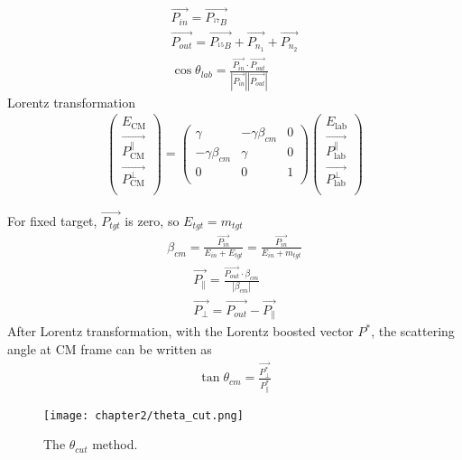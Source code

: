 \begin{align}
    \vec{P_{in}} = \vec{P_{{}^{17}B}} \\
    \vec{P_{out}} = \vec{P_{{}^{15}B}} + \vec{P_{n_1}} + \vec{P_{n_2}}\\
    \cos \theta_{lab} = \frac{\vec{P_{in}} \cdot \vec{P_{out}}}{|\vec{P_{in}}||\vec{P_{out}}|}
\end{align}
Lorentz transformation
\begin{align}
    \begin{pmatrix}
        E_{\text{CM}} \\
        \vec{P_{\text{CM}}^{\parallel}} \\
        \vec{P_{\text{CM}}^{\perp}} \\
    \end{pmatrix}
    =
    \begin{pmatrix}
        \gamma & -\gamma \beta_{cm} & 0 \\
        -\gamma \beta_{cm} & \gamma & 0 \\
        0 & 0 & 1 \\
    \end{pmatrix}
    \begin{pmatrix}
        E_{\text{lab}} \\
        \vec{P_{\text{lab}}^{\parallel}} \\
        \vec{P_{\text{lab}}^{\perp}} \\
    \end{pmatrix} 
\end{align}


For fixed target, $\vec{P_{tgt}}$ is zero, so $E_{tgt} = m_{tgt}$
\begin{align}
    \beta_{cm} = \frac{\vec{P_{in}}}{E_{in} + E_{tgt}} = \frac{\vec{P_{in}}}{E_{in} + m_{tgt}}
\end{align}
\begin{align}
    \vec{P_{\parallel}} = \frac{\vec{P_{out}} \cdot \beta_{cm}}{|\beta_{cm}|}\\
    \vec{P_{\perp}} = \vec{P_{out}} - \vec{P_{\parallel}}
\end{align}
After Lorentz transformation, with the Lorentz boosted vector $P^*$, the scattering angle at CM frame can be written as
\begin{align}
    \tan \theta_{cm} = \frac{\vec{P^*_{\perp}}}{P^*_{\parallel}}
\end{align}

\begin{figure}[b]
    \centering
    \texttt{[image: chapter2/theta\_cut.png]}
    \caption[The $\theta_{cut}$ method]{The $\theta_{cut}$ method. \cite{Nakamura11Li}}
\end{figure}

